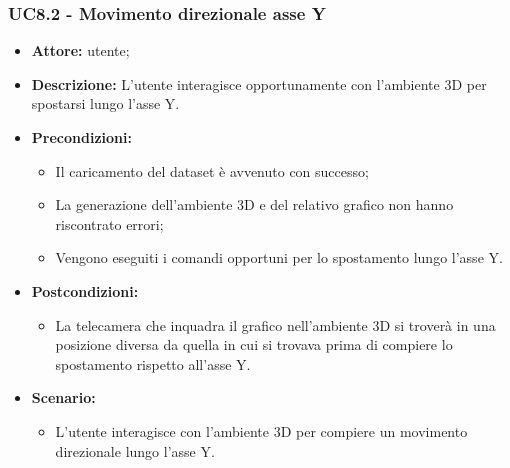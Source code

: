 \subsubsection{UC8.2 - Movimento direzionale asse Y}
\begin{itemize}    
    \item \textbf{Attore:} utente;
    \item \textbf{Descrizione:} L'utente interagisce opportunamente con l'ambiente 3D per spostarsi lungo l'asse Y.
    \item \textbf{Precondizioni:}   
        \begin{itemize}
            \item Il caricamento del dataset è avvenuto con successo;
            \item La generazione dell'ambiente 3D e del relativo grafico non hanno riscontrato errori;
            \item Vengono eseguiti i comandi opportuni per lo spostamento lungo l'asse Y.
        \end{itemize}    
    \item \textbf{Postcondizioni:}
        \begin{itemize}
            \item La telecamera che inquadra il grafico nell'ambiente 3D si troverà in una posizione diversa da quella in cui si trovava prima di compiere lo spostamento rispetto all'asse Y.
        \end{itemize}    
    \item \textbf{Scenario:} 
        \begin{itemize}
            \item L'utente interagisce con l'ambiente 3D per compiere un movimento direzionale lungo l'asse Y.
        \end{itemize}
\end{itemize}
